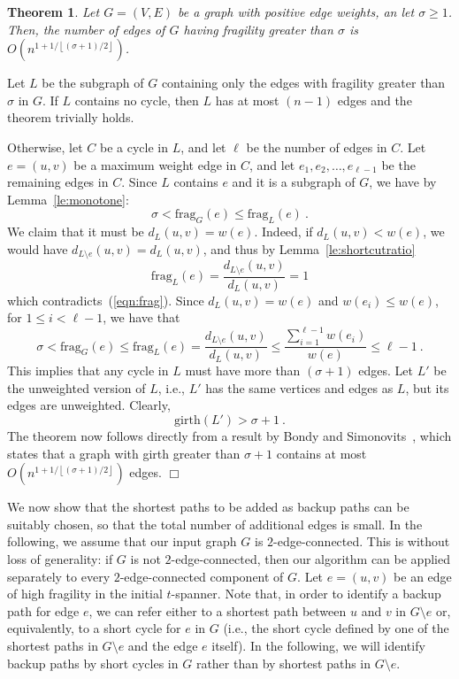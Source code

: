 \documentclass{article}
\newcommand{\dist}          {d}
\newcommand{\frag}          {\mathrm{frag}}
\newcommand{\girth}          {\mathrm{girth}}
\newtheorem{theorem}{Theorem}
\newcommand{\qed}{\hfill \ensuremath{\Box}}
\newenvironment{proof}{\vspace{1ex}\noindent{\bf Proof.}\hspace{0.5em}}
	{\hfill\qed\vspace{2ex}}
\newcommand{\floor}[1]       {\left\lfloor #1 \right\rfloor}
\begin{document}
\begin{theorem}\label{th:fewhighshval}
Let $G=(V,E)$ be a graph with positive edge weights, an let $\sigma \geq 1$. Then, the number of edges of $G$ having fragility greater than $\sigma$ is $O(n^{1+1/\floor{(\sigma+1)/2}})$.
\end{theorem}
\begin{proof}
Let $L$ be the subgraph of $G$ containing only the edges with fragility  greater than $\sigma$ in $G$.
If $L$ contains no cycle, then $L$ has at most $(n-1)$ edges and the theorem trivially holds.

Otherwise, let $C$ be a cycle in $L$, and let $\ell$ be the number of edges in $C$.
Let $e=(u,v)$ be a maximum weight edge in $C$, and let $e_1, e_2, \ldots, e_{\ell-1}$ be the remaining edges in $C$. 
Since $L$ contains $e$ and it is a subgraph of $G$, we have by Lemma~\ref{le:monotone}:
\begin{equation}
\sigma < \frag_G(e) \leq \frag_L(e)\ .
\label{eqn:frag}
\end{equation}
We claim that it must be $\dist_{L}(u,v)= w(e)$. Indeed, if $\dist_{L}(u,v)< w(e)$, we would have $\dist_{L\setminus e}(u,v)=\dist_{L}(u,v)$, and thus by Lemma~\ref{le:shortcutratio}
$$\frag_L(e) =  \frac{\dist_{L\setminus e}(u,v)}{\dist_{L}(u,v)}=1$$
which contradicts~(\ref{eqn:frag}).
Since $\dist_{L}(u,v)= w(e)$ and $w(e_i) \leq w(e)$, for $1 \leq i < \ell-1$, we have that
$$\sigma < \frag_G(e) \leq \frag_L(e) =  \frac{\dist_{L\setminus e}(u,v)}{\dist_{L}(u,v)} \leq
\frac{\sum_{i=1}^{\ell-1} w(e_i)}{w(e)}\leq \ell -1\ .$$
This implies that any cycle in $L$ must have more than $(\sigma+1)$ edges.
Let $L'$ be the unweighted version of $L$, i.e., $L'$ has the same vertices and edges as $L$, but its edges are unweighted.
Clearly,
$$\girth(L') > \sigma + 1\ .$$
The theorem now follows directly from a result by Bondy and Simonovits~\cite{bondy}, which states that a graph with girth greater than $\sigma + 1$ contains at most $O(n^{1+1/\floor{(\sigma+1)/2}})$ edges.
\end{proof}

We now show that  the shortest paths to be added as backup paths can be suitably chosen, so that the total number of additional edges is small. In the following, we assume that our input graph $G$ is $2$-edge-connected. 
This is without loss of generality: if $G$ is not $2$-edge-connected, 
then our algorithm can be applied separately to every $2$-edge-connected component of $G$.
Let $e=(u,v)$ be an edge of high fragility in the initial $t$-spanner. Note that, in order to identify a backup path for edge $e$, we  can refer either to a shortest path between $u$ and $v$ in $G\setminus e$ or, equivalently, to a short cycle for $e$ in $G$ (i.e., the short cycle defined by one of the shortest paths in $G\setminus e$ and the edge $e$ itself). In the following, we will identify backup paths by short cycles in $G$ rather than by shortest paths in $G\setminus e$.
\end{document}
